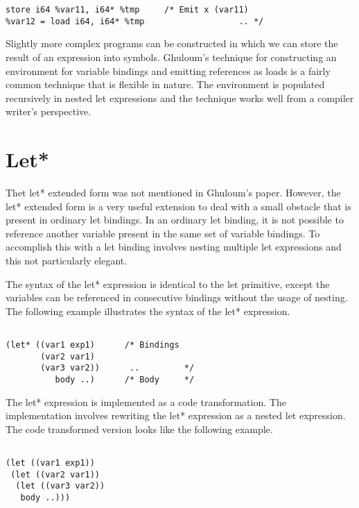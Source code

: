 \documentclass{article}
\begin{document}
\begin{verbatim}
store i64 %var11, i64* %tmp     /* Emit x (var11)     
%var12 = load i64, i64* %tmp                   .. */
\end{verbatim}

Slightly more complex programs can be constructed in which we can store the result of an expression into symbols. Ghuloum's technique for constructing an environment for variable bindings and emitting references as loads is a fairly common technique that is flexible in nature. The environment is populated recursively in nested let expressions and the technique works well from a compiler writer's perspective.

\section{Let*}


Thet let* extended form was not mentioned in Ghuloum's paper. However, the let* extended form is a very useful extension to deal with a small obstacle that is present in ordinary let bindings. In an ordinary let binding, it is not possible to reference another variable present in the same set of variable bindings. To accomplish this with a let binding involves nesting multiple let expressions and this not particularly elegant.

The syntax of the let* expression is identical to the let primitive, except the variables can be referenced in consecutive bindings without the usage of nesting. The following example illustrates the syntax of the let* expression.

\begin{verbatim}

(let* ((var1 exp1)      /* Bindings
       (var2 var1)     
       (var3 var2))      ..         */
          body ..)      /* Body     */   

\end{verbatim}

The let* expression is implemented as a code transformation. The implementation involves rewriting the let* expression as a nested let expression. The code transformed version looks like the following example.

\begin{verbatim}

(let ((var1 exp1))
 (let ((var2 var1))
  (let ((var3 var2))
   body ..))) 
 
\end{verbatim}
\end{document}
